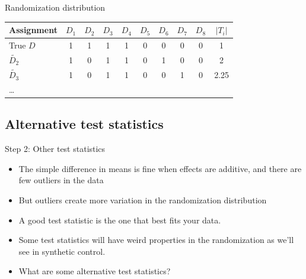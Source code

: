\documentclass{beamer}
\begin{document}
\begin{frame}{Randomization distribution}

\begin{table}[htbp]\centering
\begin{center}
\begin{threeparttable}
\begin{tabular}{lccccccccc}
\toprule
\multicolumn{1}{l}{Assignment}&
\multicolumn{1}{c}{$D_1$}&
\multicolumn{1}{c}{$D_2$}&
\multicolumn{1}{c}{$D_3$}&
\multicolumn{1}{c}{$D_4$}&
\multicolumn{1}{c}{$D_5$}&
\multicolumn{1}{c}{$D_6$}&
\multicolumn{1}{c}{$D_7$}&
\multicolumn{1}{c}{$D_8$}&
\multicolumn{1}{c}{$|T_i|$}\\
\midrule
True $D$ & 1 & 1 & 1 & 1 & 0 & 0 & 0 & 0 & 1 \\
$\tilde{D_2}$ & 1 & 0 & 1 & 1 & 0 & 1 & 0 & 0 & 2 \\
$\tilde{D_3}$ & 1 & 0 & 1 & 1 & 0 & 0 & 1 & 0 & 2.25 \\
\dots \\
\bottomrule
\end{tabular}
\end{threeparttable}
\end{center}
\end{table}

\end{frame}

\subsection{Alternative test statistics}

\begin{frame}{Step 2: Other test statistics}

\begin{itemize}
\item The simple difference in means is fine when effects are additive, and there are few outliers in the data
\item But outliers create more variation in the randomization distribution
\item A good test statistic is the one that best fits your data.  
\item Some test statistics will have weird properties in the randomization as we'll see in synthetic control.
\item What are some alternative test statistics?
\end{itemize}

\end{frame}
\end{document}
